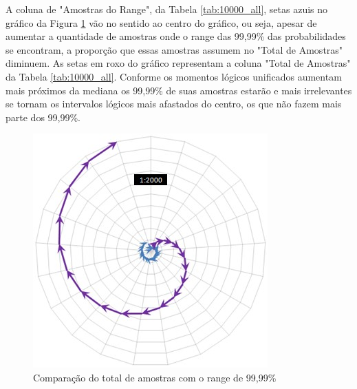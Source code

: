 A coluna de "Amostras do Range", da Tabela \ref{tab:10000_all}, setas azuis no gráfico da Figura \ref{fig:total_comparison_chart_with_99_range} vão no sentido ao centro do gráfico, ou seja, apesar de aumentar a quantidade de amostras onde o range das 99,99\% das probabilidades se encontram, a proporção que essas amostras assumem no "Total de Amostras"  diminuem. As setas em roxo do gráfico representam a coluna "Total de Amostras" da Tabela \ref{tab:10000_all}. Conforme os momentos lógicos unificados aumentam mais próximos da mediana os 99,99\% de suas amostras estarão e mais irrelevantes se tornam os intervalos lógicos mais afastados do centro, os que não fazem mais parte dos 99,99\%.
\begin{figure}[H]
\caption{Comparação do total de amostras com o range de 99,99\% }
\label{fig:total_comparison_chart_with_99_range}
\centering
\includegraphics[scale=.9]{sections/images/total_comparison_chart_with_99_range.jpg}
\end{figure}


